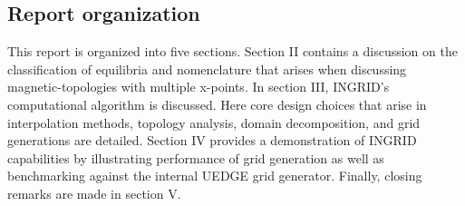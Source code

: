 \subsection{\label{sec:level2}Report organization}
This report is organized into five sections. Section II contains a discussion on the classification of equilibria and nomenclature that arises when discussing magnetic-topologies with multiple x-points. 
In section III, INGRID's computational algorithm is discussed. Here core design choices that arise in interpolation methods, topology analysis, domain decomposition, and grid generations are detailed. Section IV provides a demonstration of INGRID capabilities by illustrating performance of grid generation as well as benchmarking against the internal UEDGE grid generator. Finally, closing remarks are made in section V.